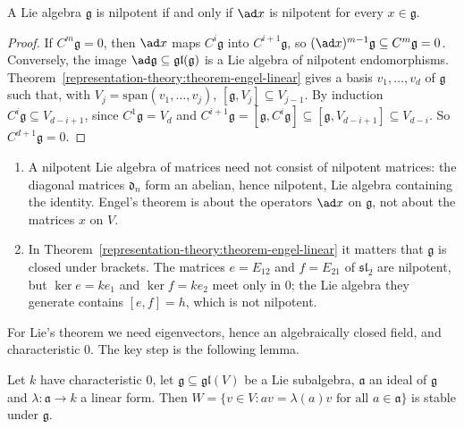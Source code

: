\begin{corollary}\label{representation-theory:corollary-engel}
A Lie algebra $\mathfrak{g}$ is nilpotent if and only if $\ad x$ is nilpotent for every $x \in \mathfrak{g}$.
\end{corollary}

\begin{proof}
If $C^m\mathfrak{g} = 0$, then $\ad x$ maps $C^i\mathfrak{g}$ into $C^{i+1}\mathfrak{g}$, so $(\ad x)^{m-1}\mathfrak{g} \subseteq C^m\mathfrak{g} = 0$. Conversely, the image
$\ad\mathfrak{g} \subseteq \mathfrak{gl}(\mathfrak{g})$ is a Lie algebra of nilpotent endomorphisms. Theorem~\ref{representation-theory:theorem-engel-linear} gives a basis
$v_1, \ldots, v_d$ of $\mathfrak{g}$ such that, with $V_j = \mathrm{span}(v_1, \ldots, v_j)$, $[\mathfrak{g}, V_j] \subseteq V_{j-1}$. By induction
$C^i\mathfrak{g} \subseteq V_{d - i + 1}$, since $C^1\mathfrak{g} = V_d$ and $C^{i+1}\mathfrak{g} = [\mathfrak{g}, C^i\mathfrak{g}] \subseteq [\mathfrak{g}, V_{d-i+1}] \subseteq V_{d-i}$.
So $C^{d+1}\mathfrak{g} = 0$.
\end{proof}

\begin{counterexample}\label{representation-theory:counterexample-engel}
\begin{enumerate}
\item A nilpotent Lie algebra of matrices need not consist of nilpotent matrices: the diagonal matrices $\mathfrak{d}_n$ form an abelian, hence nilpotent, Lie algebra
containing the identity. Engel's theorem is about the operators $\ad x$ on $\mathfrak{g}$, not about the matrices $x$ on $V$.
\item In Theorem~\ref{representation-theory:theorem-engel-linear} it matters that $\mathfrak{g}$ is closed under brackets. The matrices $e = E_{12}$ and $f = E_{21}$ of
$\mathfrak{sl}_2$ are nilpotent, but $\ker e = ke_1$ and $\ker f = ke_2$ meet only in $0$; the Lie algebra they generate contains $[e, f] = h$, which is not nilpotent.
\end{enumerate}
\end{counterexample}

For Lie's theorem we need eigenvectors, hence an algebraically closed field, and characteristic $0$. The key step is the following lemma.

\begin{lemma}\label{representation-theory:lemma-invariance}
Let $k$ have characteristic $0$, let $\mathfrak{g} \subseteq \mathfrak{gl}(V)$ be a Lie subalgebra, $\mathfrak{a}$ an ideal of $\mathfrak{g}$ and
$\lambda \colon \mathfrak{a} \to k$ a linear form. Then $W = \{v \in V : av = \lambda(a)v \text{ for all } a \in \mathfrak{a}\}$ is stable under $\mathfrak{g}$.
\end{lemma}

